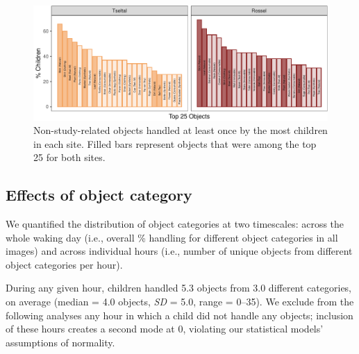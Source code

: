 \documentclass[10pt, letterpaper]{article}
\newenvironment{CodeChunk}{}{}
\begin{document}
\begin{CodeChunk}
\begin{figure}[!ht]

{\centering \includegraphics{figs/top-objects-fig-1} 

}

\caption[Non-study-related objects handled at least once by the most children in each site]{Non-study-related objects handled at least once by the most children in each site. Filled bars represent objects that were among the top 25 for both sites.}\label{fig:top-objects-fig}
\end{figure}
\end{CodeChunk}

\hypertarget{effects-of-object-category}{%
\subsection{Effects of object
category}\label{effects-of-object-category}}

We quantified the distribution of object categories at two timescales:
across the whole waking day (i.e., overall \% handling for different
object categories in all images) and across individual hours (i.e.,
number of unique objects from different object categories per hour).

During any given hour, children handled 5.3 objects from 3.0 different
categories, on average (median = 4.0 objects, \emph{SD} = 5.0, range =
0--35). We exclude from the following analyses any hour in which a child
did not handle any objects; inclusion of these hours creates a second
mode at 0, violating our statistical models' assumptions of normality.
\end{document}
